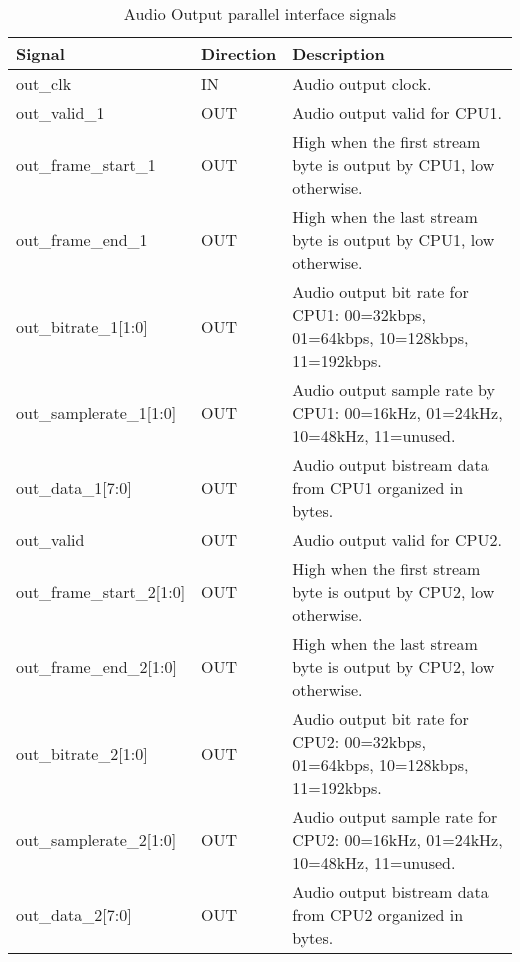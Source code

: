 \documentclass{ug}
\theoremstyle{plain}
\begin{document}
\begin{table}[H]
  \begin{center}
    \begin{tabular}{|l|l|p{8cm}|}
      \hline
      \rowcolor{iob-green}
      \textbf{Signal} & \textbf{Direction} & \textbf{Description} \\
      \hline
      \hline

      out\_clk & IN & Audio output clock.\\ \hline

      \rowcolor{iob-blue} out\_valid\_1 & OUT & Audio output valid for CPU1. \\ \hline
      
      out\_frame\_start\_1 & OUT & High when the first stream byte is output by CPU1, low
      otherwise.\\ \hline

      \rowcolor{iob-blue} out\_frame\_end\_1 & OUT & High when the last stream byte
      is output by CPU1, low otherwise.\\ \hline

      out\_bitrate\_1[1:0] & OUT & Audio output bit rate for CPU1: 00=32kbps,
      01=64kbps, 10=128kbps, 11=192kbps.\\ \hline

      \rowcolor{iob-blue}
      out\_samplerate\_1[1:0] & OUT & Audio output sample rate by CPU1: 00=16kHz,
      01=24kHz, 10=48kHz, 11=unused.\\ \hline

      out\_data\_1[7:0] & OUT & Audio output bistream data from CPU1 organized in bytes.\\
      \hline
      \hline

      \rowcolor{iob-blue} out\_valid & OUT & Audio output valid for CPU2. \\ \hline
      
      out\_frame\_start\_2[1:0] & OUT & High when the first stream byte is output by CPU2, low
      otherwise.\\ \hline

      \rowcolor{iob-blue} out\_frame\_end\_2[1:0] & OUT & High when the last stream byte
      is output by CPU2, low otherwise.\\ \hline

      out\_bitrate\_2[1:0] & OUT & Audio output bit rate for CPU2: 00=32kbps,
      01=64kbps, 10=128kbps, 11=192kbps.\\ \hline

      \rowcolor{iob-blue}
      out\_samplerate\_2[1:0] & OUT & Audio output sample rate for CPU2: 00=16kHz,
      01=24kHz, 10=48kHz, 11=unused.\\ \hline

      out\_data\_2[7:0] & OUT & Audio output bistream data  from CPU2 organized in bytes.\\
      \hline

    \end{tabular}
    \caption{Audio Output parallel interface signals}
    \label{tab:out}
  \end{center}
\end{table}
\end{document}
